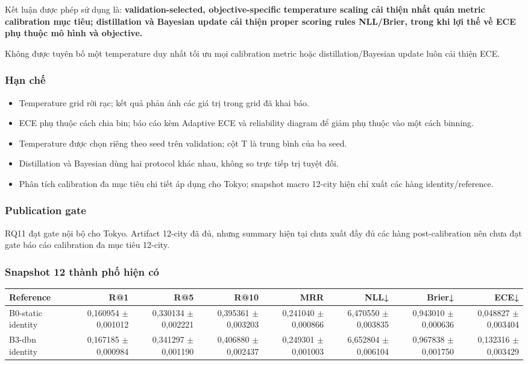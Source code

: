 Kết luận được phép sử dụng là: \textbf{validation-selected, objective-specific temperature scaling cải thiện nhất quán metric calibration mục tiêu; distillation và Bayesian update cải thiện proper scoring rules NLL/Brier, trong khi lợi thế về ECE phụ thuộc mô hình và objective.}

Không được tuyên bố một temperature duy nhất tối ưu mọi calibration metric hoặc distillation/Bayesian update luôn cải thiện ECE.

\subsubsection*{Hạn chế}

\begin{itemize}
\item Temperature grid rời rạc; kết quả phản ánh các giá trị trong grid đã khai báo.
\item ECE phụ thuộc cách chia bin; báo cáo kèm Adaptive ECE và reliability diagram để giảm phụ thuộc vào một cách binning.
\item Temperature được chọn riêng theo seed trên validation; cột T là trung bình của ba seed.
\item Distillation và Bayesian dùng hai protocol khác nhau, không so trực tiếp trị tuyệt đối.
\item Phân tích calibration đa mục tiêu chi tiết áp dụng cho Tokyo; snapshot macro 12-city hiện chỉ xuất các hàng identity/reference.
\end{itemize}

\subsubsection*{Publication gate}

RQ11 đạt gate nội bộ cho Tokyo. Artifact 12-city đã đủ, nhưng summary hiện tại chưa xuất đầy đủ các hàng post-calibration nên chưa đạt gate báo cáo calibration đa mục tiêu 12-city.

\subsubsection*{Snapshot 12 thành phố hiện có}

\begin{table}[!htbp]
\centering
\scriptsize
\setlength{\tabcolsep}{2.5pt}
\begin{adjustbox}{max width=\textwidth}
\begin{tabular}{@{}lrrrrrrr@{}}
\toprule
Reference & R@1 & R@5 & R@10 & MRR & NLL↓ & Brier↓ & ECE↓ \\
\midrule
B0-static identity & 0,160954 $\pm$ 0,001012 & 0,330134 $\pm$ 0,002221 & 0,395361 $\pm$ 0,003203 & 0,241040 $\pm$ 0,000866 & 6,470550 $\pm$ 0,003835 & 0,943010 $\pm$ 0,000636 & 0,048827 $\pm$ 0,003404 \\
B3-dbn identity & 0,167185 $\pm$ 0,000984 & 0,341297 $\pm$ 0,001190 & 0,406880 $\pm$ 0,002437 & 0,249301 $\pm$ 0,001003 & 6,652804 $\pm$ 0,006104 & 0,967838 $\pm$ 0,001750 & 0,132316 $\pm$ 0,003429 \\
\bottomrule
\end{tabular}
\end{adjustbox}
\end{table}

